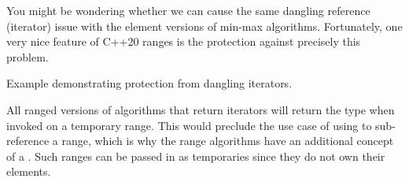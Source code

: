 You might be wondering whether we can cause the same dangling reference (iterator) issue with the element versions of min-max algorithms. Fortunately, one very nice feature of C++20 ranges is the protection against precisely this problem.

\begin{box-note}
\footnotesize Example demonstrating protection from dangling iterators.
\tcblower
{}
\end{box-note}

All ranged versions of algorithms that return iterators will return the  type when invoked on a temporary range. This would preclude the use case of using  to sub-reference a range, which is why the range algorithms have an additional concept of a . Such ranges can be passed in as temporaries since they do not own their elements.